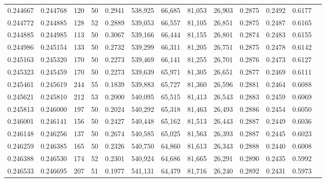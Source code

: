 \begin{tabular}{rrrrrrrrrrrrr}
0.244667 & 0.244768 &   120 &  50 &                                     0.2941 & 538,925 &  66,685 &  81,053 &  26,903 & 0.2875 & 0.2492 & 0.6177 \\
0.244772 & 0.244885 &   128 &  52 &                                     0.2889 & 539,053 &  66,557 &  81,105 &  26,851 & 0.2875 & 0.2487 & 0.6165 \\
0.244885 & 0.244985 &   113 &  50 &                                     0.3067 & 539,166 &  66,444 &  81,155 &  26,801 & 0.2874 & 0.2483 & 0.6155 \\
0.244986 & 0.245154 &   133 &  50 &                                     0.2732 & 539,299 &  66,311 &  81,205 &  26,751 & 0.2875 & 0.2478 & 0.6142 \\
0.245163 & 0.245320 &   170 &  50 &                                     0.2273 & 539,469 &  66,141 &  81,255 &  26,701 & 0.2876 & 0.2473 & 0.6127 \\
0.245323 & 0.245459 &   170 &  50 &                                     0.2273 & 539,639 &  65,971 &  81,305 &  26,651 & 0.2877 & 0.2469 & 0.6111 \\
0.245461 & 0.245619 &   244 &  55 &                                     0.1839 & 539,883 &  65,727 &  81,360 &  26,596 & 0.2881 & 0.2464 & 0.6088 \\
0.245621 & 0.245810 &   212 &  53 &                                     0.2000 & 540,095 &  65,515 &  81,413 &  26,543 & 0.2883 & 0.2459 & 0.6069 \\
0.245813 & 0.246000 &   197 &  50 &                                     0.2024 & 540,292 &  65,318 &  81,463 &  26,493 & 0.2886 & 0.2454 & 0.6050 \\
0.246001 & 0.246141 &   156 &  50 &                                     0.2427 & 540,448 &  65,162 &  81,513 &  26,443 & 0.2887 & 0.2449 & 0.6036 \\
0.246148 & 0.246256 &   137 &  50 &                                     0.2674 & 540,585 &  65,025 &  81,563 &  26,393 & 0.2887 & 0.2445 & 0.6023 \\
0.246259 & 0.246385 &   165 &  50 &                                     0.2326 & 540,750 &  64,860 &  81,613 &  26,343 & 0.2888 & 0.2440 & 0.6008 \\
0.246388 & 0.246530 &   174 &  52 &                                     0.2301 & 540,924 &  64,686 &  81,665 &  26,291 & 0.2890 & 0.2435 & 0.5992 \\
0.246533 & 0.246695 &   207 &  51 &                                     0.1977 & 541,131 &  64,479 &  81,716 &  26,240 & 0.2892 & 0.2431 & 0.5973 \\

\end{tabular}
